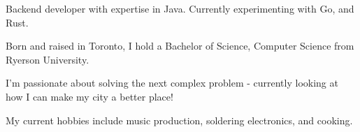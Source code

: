 

\begin{cvparagraph}
Backend developer with expertise in Java. Currently experimenting with Go, and Rust.

Born and raised in Toronto, I hold a Bachelor of Science, Computer Science from Ryerson University.

I'm passionate about solving the next complex problem - currently looking at how I can make my city a better place!

My current hobbies include music production, soldering electronics, and cooking.
\end{cvparagraph}
